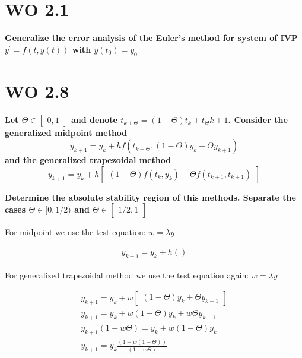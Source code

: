 \documentclass[a4paper]{article}
\begin{document}
\section*{WO 2.1}
\textbf{Generalize the error analysis of the Euler's method for system of IVP $y^{\prime} = f(t,y(t))$ with $y(t_0) = y_0$}

\section{WO 2.8}
\textbf{Let $\Theta \in \begin{bmatrix} 0, 1 \end{bmatrix}$ and denote $t_{k+\Theta} = (1-\Theta)t_k+t_\Theta{k+1}$. Consider the generalized midpoint method}
\begin{equation}
y_{k+1} = y_k+hf(t_{k+\Theta},(1-\Theta)y_k+\Theta y_{k+1})
\end{equation}
\textbf{and the generalized trapezoidal method}
\begin{equation}
y_{k+1} = y_k+h \begin{bmatrix} (1-\Theta)f(t_k,y_k) + \Theta f(t_{k+1},t_{k+1})  \end{bmatrix}
\end{equation}

\textbf{Determine the absolute stability region of this methods. Separate the cases $\Theta \in [0,1/2)$ and $ \Theta \in \begin{bmatrix} 1/2,1 \end{bmatrix}$}


For midpoint we use the test equation: $w = \lambda y$ 

\begin{equation}
\begin{aligned}
y_{k+1} = y_k + h()
\end{aligned}
\end{equation}


For generalized trapezoidal method we use the test equation again: $w = \lambda y$ 



\begin{equation}
 \begin{aligned}
 y_{k+1} = y_k+ w\begin{bmatrix} (1-\Theta)y_k + \Theta y_{k+1}  \end{bmatrix}\\
 y_{k+1} = y_k+ w(1-\Theta)y_k + w\Theta y_{k+1}\\
 y_{k+1}(1 - w \Theta ) = y_k + w(1 -  \Theta)y_k \\
 y_{k+1} = y_k \frac{(1 + w(1 - \Theta))} {(1 - w \Theta )} 
 \end{aligned}
\end{equation}
\end{document}
